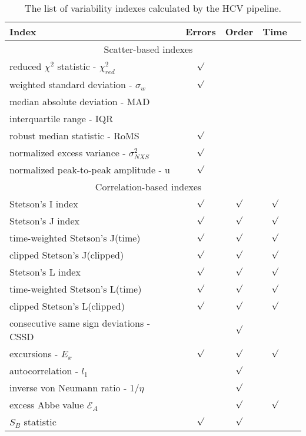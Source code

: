 \documentclass{iau}
\begin{document}
\begin{table}
  \begin{center}
  \caption{The list of variability indexes calculated by the HCV pipeline.}
  \label{tab1}
 {\scriptsize
  \begin{tabular}{lcccc}\hline 
{\bf Index} & {\bf Errors} & {\bf Order} & {\bf Time} 
  \\ \hline
\multicolumn{4}{c}{Scatter-based indexes}  \\
reduced $\chi^2$ statistic - $\chi^2_{red}$  & $\surd$ \\
weighted standard deviation - $\sigma_w$ &$\surd$  \\
median absolute deviation - MAD  \\
interquartile range - IQR  \\
robust median statistic - RoMS& $\surd$ \\ 
normalized excess variance - $\sigma^2_{NXS}$ & $\surd$ \\ 
normalized peak-to-peak amplitude - u& $\surd$ \\
\multicolumn{4}{c}{Correlation-based indexes}\\
Stetson's I index& $\surd$ &$\surd$ & $\surd$ \\
Stetson's J index&  $\surd$ &$\surd$ & $\surd$ \\
time-weighted Stetson's J(time) & $\surd$ &$\surd$ & $\surd$ \\
clipped Stetson's J(clipped) & $\surd$ &$\surd$ & $\surd$ \\
Stetson's L index & $\surd$ &$\surd$ & $\surd$ \\
time-weighted Stetson's L(time) & $\surd$ &$\surd$ & $\surd$ \\
clipped Stetson's L(clipped)& $\surd$ &$\surd$ & $\surd$ \\
consecutive same sign deviations - CSSD & &$\surd$ \\
excursions - $E_x$ & $\surd$ &$\surd$ & $\surd$ \\
autocorrelation - $l_1$&&$\surd$\\
inverse von Neumann ratio - 1/$\eta$&&$\surd$\\
excess Abbe value $\mathcal{E}_A$&  &$\surd$ & $\surd$ \\
$S_B$ statistic & $\surd$ &$\surd$  \\ \hline
  \end{tabular}
  }
 \end{center}
\vspace{1mm}
\end{table}
\end{document}
